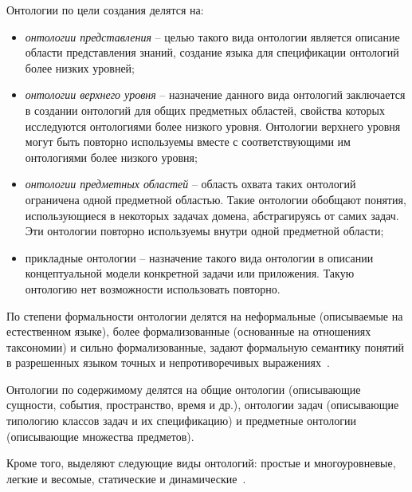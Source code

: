 Онтологии по цели создания делятся на:
\begin{itemize}
  \item \textit{онтологии представления} – целью такого вида онтологии является описание области представления знаний, создание языка для спецификации онтологий более низких уровней;
  \item \textit{онтологии верхнего уровня} – назначение данного вида онтологий заключается в создании онтологий для общих предметных областей, свойства которых исследуются онтологиями более низкого уровня. Онтологии верхнего уровня могут быть повторно используемы вместе с соответствующими им онтологиями более низкого уровня;
  \item \textit{онтологии предметных областей} – область охвата таких онтологий ограничена одной предметной областью. Такие онтологии обобщают понятия, использующиеся в некоторых задачах домена, абстрагируясь от самих задач. Эти онтологии повторно используемы внутри одной предметной области;
  \item прикладные онтологии – назначение такого вида онтологии в описании концептуальной модели конкретной задачи или приложения. Такую онтологию нет возможности использовать повторно.
\end{itemize}

По степени формальности онтологии делятся на неформальные (описываемые на естественном языке), более формализованные (основанные на отношениях таксономии) и сильно формализованные, задают формальную семантику понятий в разрешенных языком точных и непротиворечивых выражениях~\cite{Nikonenko2009}.

Онтологии по содержимому делятся на общие онтологии (описывающие сущности, события, пространство, время и др.), онтологии задач (описывающие типологию классов задач и их спецификацию) и предметные онтологии (описывающие множества предметов).

Кроме того, выделяют следующие виды онтологий: простые и многоуровневые, легкие и весомые, статические и динамические~\cite{Kleschev2001}. 

